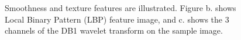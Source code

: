 \documentclass[conference,a4paper]{IEEEtran}
\begin{document}
\begin{figure}
  \centering
  \caption{
  Smoothness and texture features are illustrated.  Figure b. shows Local Binary Pattern (LBP) feature image, and c. shows the 3 channels of the DB1 wavelet transform on the sample image.
  }
  \label{fig:tex}
\end{figure}
\end{document}
